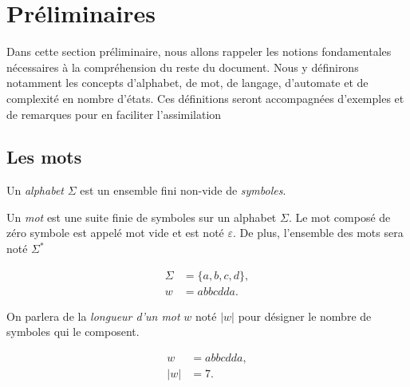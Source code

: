 \section{Préliminaires}

Dans cette section préliminaire, nous allons rappeler les notions
fondamentales nécessaires à la compréhension du reste du document. Nous y
définirons notamment les concepts d’alphabet, de mot, de langage, d’automate
et de complexité en nombre d’états. Ces définitions seront accompagnées
d’exemples et de remarques pour en faciliter l’assimilation

\subsection{Les mots}

\begin{definition}[Alphabet]
  Un \textit{alphabet} \(\Sigma\) est un ensemble fini non-vide de
  \textit{symboles}.
\end{definition}

\begin{definition}[Mot]
  Un \textit{mot} est une suite finie de symboles sur un alphabet \(\Sigma\).
  Le mot composé de zéro symbole est appelé mot vide et est noté 
  \(\varepsilon\). De plus, l'ensemble des mots sera noté \(\Sigma^*\)
\end{definition}

\begin{example}
  \vspace{-\baselineskip}
  \begin{align*}
    \Sigma &= \{a, b, c, d\}, \\
    w &= abbcdda.
  \end{align*}
\end{example}

\begin{definition}
  On parlera de la \textit{longueur d'un mot} \(w\) noté \(\lvert w \rvert\)
  pour désigner le nombre de symboles qui le composent. 
\end{definition}

\begin{example}
  \vspace{-\baselineskip}
  \begin{align*}
    w &= abbcdda, \\
    \lvert w \rvert &= 7.
  \end{align*}
\end{example}


